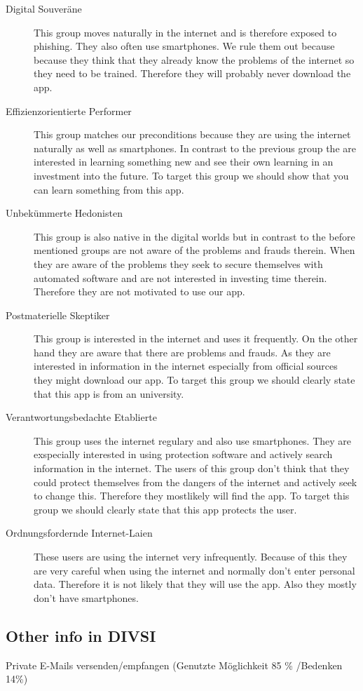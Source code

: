\begin{description}
\item[Digital Souveräne] This group moves naturally in the internet and is therefore exposed to phishing. They also often use smartphones. We rule them out because because they think that they already know the problems of the internet so they need to be trained. Therefore they will probably never download the app.
\item[Effizienzorientierte Performer] This group matches our preconditions because they are using the internet naturally as well as smartphones. In contrast to the previous group the are interested in learning something new and see their own learning in an investment into the future. To target this group we should show that you can learn something from this app.
\item[Unbekümmerte Hedonisten] This group is also native in the digital worlds but in contrast to the before mentioned groups are not aware of the problems and frauds therein. When they are aware of the problems they seek to secure themselves with automated software and are not interested in investing time therein. Therefore they are not motivated to use our app.
\item[Postmaterielle Skeptiker] This group is interested in the internet and uses it frequently. On the other hand they are aware that there are problems and frauds. As they are interested in information in the internet especially from official sources they might download our app. To target this group we should clearly state that this app is from an university.
\item[Verantwortungsbedachte Etablierte] This group uses the internet regulary and also use smartphones. They are exspecially interested in using protection software and actively search information in the internet. The users of this group don't think that they could protect themselves from the dangers of the internet and actively seek to change this. Therefore they mostlikely will find the app. To target this group we should clearly state that this app protects the user.
\item[Ordnungsfordernde Internet-Laien] These users are using the internet very infrequently. Because of this they are very careful when using the internet and normally don't enter personal data. Therefore it is not likely that they will use the app. Also they mostly don't have smartphones.
\end{description}

\subsection{Other info in DIVSI}
Private E-Mails versenden/empfangen (Genutzte Möglichkeit 85 \% \slash Bedenken 14\%)